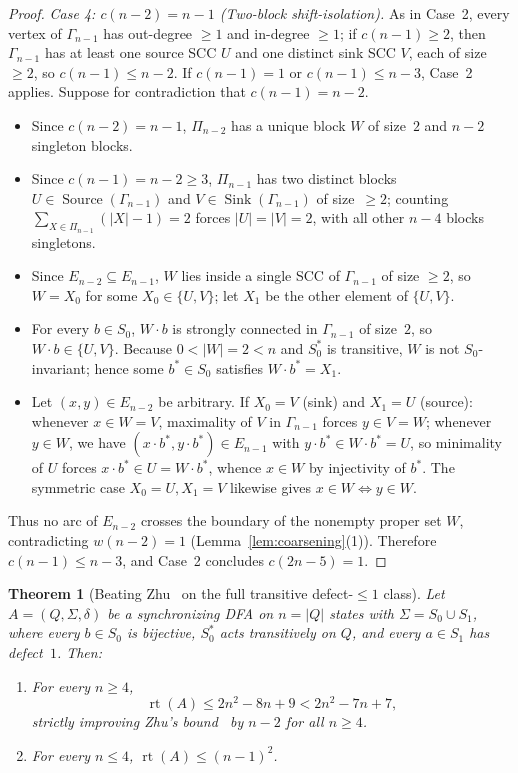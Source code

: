 \documentclass[11pt,a4paper]{article}
\newtheorem{theorem}{Theorem}[section]
\theoremstyle{definition}
\theoremstyle{remark}
\newcommand{\rt}{\operatorname{rt}}
\newcommand{\Sink}{\operatorname{Sink}}
\newcommand{\Source}{\operatorname{Source}}
\begin{document}
\begin{proof}
\emph{Case 4: $c(n - 2) = n - 1$ (Two-block shift-isolation).} As in Case~2, every vertex of $\Gamma_{n - 1}$ has out-degree $\ge 1$ and in-degree $\ge 1$; if $c(n - 1) \ge 2$, then $\Gamma_{n - 1}$ has at least one source SCC $U$ and one distinct sink SCC $V$, each of size $\ge 2$, so $c(n - 1) \le n - 2$. If $c(n - 1) = 1$ or $c(n - 1) \le n - 3$, Case~2 applies. Suppose for contradiction that $c(n - 1) = n - 2$.
\begin{itemize}[leftmargin=*,nosep]
  \item Since $c(n - 2) = n - 1$, $\Pi_{n - 2}$ has a unique block $W$ of size~$2$ and $n - 2$ singleton blocks.
  \item Since $c(n - 1) = n - 2 \ge 3$, $\Pi_{n - 1}$ has two distinct blocks $U \in \Source(\Gamma_{n - 1})$ and $V \in \Sink(\Gamma_{n - 1})$ of size~$\ge 2$; counting $\sum_{X \in \Pi_{n - 1}} (|X| - 1) = 2$ forces $|U| = |V| = 2$, with all other $n - 4$ blocks singletons.
  \item Since $E_{n - 2} \subseteq E_{n - 1}$, $W$ lies inside a single SCC of $\Gamma_{n - 1}$ of size $\ge 2$, so $W = X_0$ for some $X_0 \in \{U, V\}$; let $X_1$ be the other element of $\{U, V\}$.
  \item For every $b \in S_0$, $W \cdot b$ is strongly connected in $\Gamma_{n - 1}$ of size~$2$, so $W \cdot b \in \{U, V\}$. Because $0 < |W| = 2 < n$ and $S_0^*$ is transitive, $W$ is not $S_0$-invariant; hence some $b^* \in S_0$ satisfies $W \cdot b^* = X_1$.
  \item Let $(x, y) \in E_{n - 2}$ be arbitrary. If $X_0 = V$ (sink) and $X_1 = U$ (source): whenever $x \in W = V$, maximality of $V$ in $\Gamma_{n - 1}$ forces $y \in V = W$; whenever $y \in W$, we have $(x \cdot b^*, y \cdot b^*) \in E_{n - 1}$ with $y \cdot b^* \in W \cdot b^* = U$, so minimality of $U$ forces $x \cdot b^* \in U = W \cdot b^*$, whence $x \in W$ by injectivity of $b^*$. The symmetric case $X_0 = U, X_1 = V$ likewise gives $x \in W \iff y \in W$.
\end{itemize}
Thus no arc of $E_{n - 2}$ crosses the boundary of the nonempty proper set $W$, contradicting $w(n - 2) = 1$ (Lemma~\ref{lem:coarsening}(1)). Therefore $c(n - 1) \le n - 3$, and Case~2 concludes $c(2n - 5) = 1$.
\end{proof}

\begin{theorem}[Beating Zhu~\cite{Zhu2024} on the full transitive defect-$\le 1$ class]\label{thm:transitive-beats-zhu}
Let $A = (Q, \Sigma, \delta)$ be a synchronizing DFA on $n = |Q|$ states with $\Sigma = S_0 \cup S_1$, where every $b \in S_0$ is bijective, $S_0^*$ acts transitively on $Q$, and every $a \in S_1$ has defect~$1$. Then:
\begin{enumerate}[label=\textup{(\arabic*)},leftmargin=*,nosep]
  \item For every $n \ge 4$,
  \[
    \rt(A) \le 2n^2 - 8n + 9 < 2n^2 - 7n + 7,
  \]
  strictly improving Zhu's bound~\cite{Zhu2024} by $n - 2$ for all $n \ge 4$.
  \item For every $n \le 4$, $\rt(A) \le (n - 1)^2$.
\end{enumerate}
\end{theorem}
\end{document}
